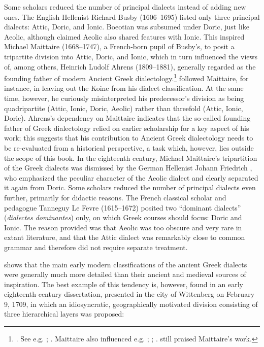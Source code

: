 {Some scholars reduced the number of principal dialects instead of adding new ones. The English Hellenist Richard Busby (1606–1695) listed only three principal dialects: Attic, Doric, and Ionic. Boeotian was subsumed under Doric, just like Aeolic, although \citet[66--67]{Busby1696} claimed Aeolic also shared features with Ionic. This inspired Michael Maittaire (1668–1747), a French-born pupil of Busby’s, to posit a tripartite division into Attic, Doric, and Ionic, which in turn influenced the views of, among others, Heinrich Ludolf Ahrens (1809–1881), generally regarded as the founding father of modern Ancient Greek dialectology.\footnote{\citet[i–ii]{Maittaire1706}. See e.g. \citet[\textsc{viii}.177]{Brekle1992}; \citet[463]{Finkelberg2014}. Maittaire also influenced e.g. \citet[213]{Thompson1732}; \citet[162]{Gesner1774}; \citet[\textsc{xxviii}]{Harles1778}. \citet[(1884–1890): 92]{Pott1974} still praised Maittaire’s work.} \citet[\textsc{i.}1]{Ahrens1839} followed Maittaire, for instance, in leaving out the Koine from his dialect classification. At the same time, however, he curiously misinterpreted his predecessor’s division as being quadripartite (Attic, Ionic, Doric, Aeolic) rather than threefold (Attic, Ionic, Doric). Ahrens’s dependency on Maittaire indicates that the so-called founding father of Greek dialectology relied on earlier scholarship for a key aspect of his work; this suggests that his contribution to Ancient Greek dialectology needs to be re-evaluated from a historical perspective, a task which, however, lies outside the scope of this book. In the eighteenth century, Michael Maittaire’s tripartition of the Greek dialects was dismissed by the German Hellenist Johann Friedrich \citet[\textsc{iv–v}]{Facius1782}, who emphasized the peculiar character of the Aeolic dialect and clearly separated it again from Doric. Some scholars reduced the number of principal dialects even further, primarily for didactic reasons. The French classical scholar and pedagogue Tanneguy Le Fevre (1615–1672) posited two “dominant dialects” (\textit{dialectes dominantes}) only, on which Greek courses should focus: Doric and Ionic. The reason \citet[61]{Le1731} provided was that Aeolic was too obscure and very rare in extant literature, and that the Attic dialect was remarkably close to common grammar and therefore did not require separate treatment.

 shows that the main early modern classifications of the ancient Greek dialects were generally much more detailed than their ancient and medieval sources of inspiration. The best example of this tendency is, however, found in an early eighteenth-century dissertation, presented in the city of Wittenberg on February 9, 1709, in which an idiosyncratic, geographically motivated division consisting of three hierarchical layers was proposed:

}
